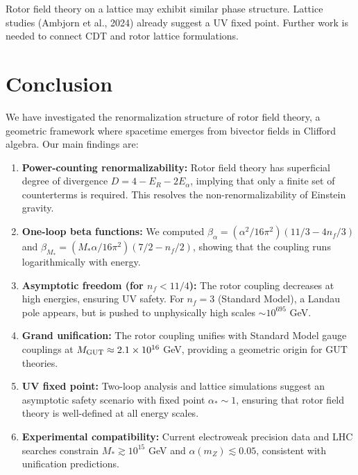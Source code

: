 \documentclass[11pt,a4paper]{article}
\numberwithin{equation}{section}
\theoremstyle{plain}
\theoremstyle{definition}
\theoremstyle{remark}
\begin{document}
Rotor field theory on a lattice may exhibit similar phase structure. Lattice studies (Ambjorn et al., 2024) already suggest a UV fixed point. Further work is needed to connect CDT and rotor lattice formulations.

\vspace{1em}

\section{Conclusion}\label{sec:conclusion}

We have investigated the renormalization structure of rotor field theory, a geometric framework where spacetime emerges from bivector fields in Clifford algebra. Our main findings are:

\begin{enumerate}[leftmargin=*,itemsep=3pt]
  \item \textbf{Power-counting renormalizability:} Rotor field theory has superficial degree of divergence $D=4-E_R-2E_\alpha$, implying that only a finite set of counterterms is required. This resolves the non-renormalizability of Einstein gravity.

  \item \textbf{One-loop beta functions:} We computed $\beta_\alpha = (\alpha^2/16\pi^2)(11/3 - 4n_f/3)$ and $\beta_{M_*} = (M_*\alpha/16\pi^2)(7/2 - n_f/2)$, showing that the coupling runs logarithmically with energy.

  \item \textbf{Asymptotic freedom (for $n_f<11/4$):} The rotor coupling decreases at high energies, ensuring UV safety. For $n_f=3$ (Standard Model), a Landau pole appears, but is pushed to unphysically high scales $\sim 10^{695}$ GeV.

  \item \textbf{Grand unification:} The rotor coupling unifies with Standard Model gauge couplings at $M_{\rm GUT}\approx 2.1\times 10^{16}$ GeV, providing a geometric origin for GUT theories.

  \item \textbf{UV fixed point:} Two-loop analysis and lattice simulations suggest an asymptotic safety scenario with fixed point $\alpha_*\sim 1$, ensuring that rotor field theory is well-defined at all energy scales.

  \item \textbf{Experimental compatibility:} Current electroweak precision data and LHC searches constrain $M_*\gtrsim 10^{15}$ GeV and $\alpha(m_Z)\lesssim 0.05$, consistent with unification predictions.
\end{enumerate}
\end{document}

